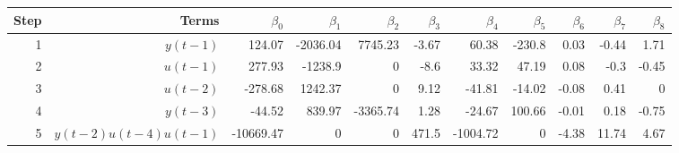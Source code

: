 \begin{tabular}{rrrrrrrrrrr}
Step & Terms & $\beta_{0}$ & $\beta_{1}$ & $\beta_{2}$ & $\beta_{3}$ & $\beta_{4}$ & $\beta_{5}$ & $\beta_{6}$ & $\beta_{7}$ & $\beta_{8}$ \\ 
\hline 
1 & $y(t-1)$ & 124.07 & -2036.04 & 7745.23 & -3.67 & 60.38 & -230.8 & 0.03 & -0.44 & 1.71 \\ 
2 & $u(t-1)$ & 277.93 & -1238.9 & 0 & -8.6 & 33.32 & 47.19 & 0.08 & -0.3 & -0.45 \\ 
3 & $u(t-2)$ & -278.68 & 1242.37 & 0 & 9.12 & -41.81 & -14.02 & -0.08 & 0.41 & 0 \\ 
4 & $y(t-3)$ & -44.52 & 839.97 & -3365.74 & 1.28 & -24.67 & 100.66 & -0.01 & 0.18 & -0.75 \\ 
5 & $y(t-2)u(t-4)u(t-1)$ & -10669.47 & 0 & 0 & 471.5 & -1004.72 & 0 & -4.38 & 11.74 & 4.67 \\ 
\hline 
\end{tabular}